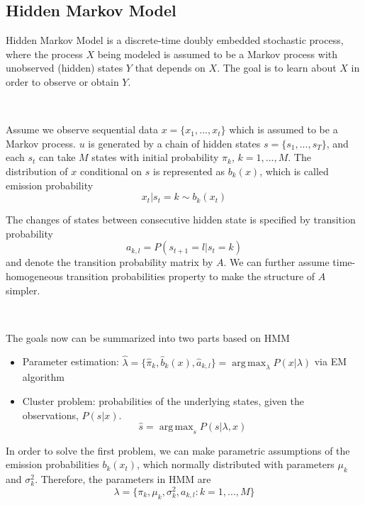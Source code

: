 \documentclass[a4paper]{article}
\DeclareMathOperator*{\argmax}{arg\,max}
\begin{document}
\subsection{Hidden Markov Model}

Hidden Markov Model is a discrete-time doubly embedded stochastic process, where the process $X$ being modeled is assumed to be a Markov process with unobserved (hidden) states $Y$ that depends on $X$.  The goal is to learn about $X$ in order to observe or obtain $Y$.

\

Assume we observe sequential data $x = \{ x_1, ..., x_t \}$ which is assumed to be a Markov process. $u$ is generated by a chain of hidden states $s = \{ s_1, ..., s_T\}$, and each $s_t$ can take $M$ states with initial probability $\pi_k$, $k=1, ..., M$. The distribution of $x$ conditional on $s$ is represented as $b_k(x)$, which is called emission probability
\begin{equation}
	x_t | s_t = k \sim b_k (x_t)
\end{equation}


The changes of states between consecutive hidden state is specified by transition probability 
\begin{equation}
	a_{k,l} = P(s_{t+1} = l | s_t = k) 
\end{equation}
and denote the transition probability matrix by $A$. We can further assume time-homogeneous transition probabilities property to make the structure of $A$ simpler.  

\

The goals now can be summarized into two parts based on HMM
\begin{itemize}
	\item Parameter estimation: $\hat{\lambda} = \{ \hat{\pi}_k, \hat{b}_k(x), \hat{a}_{k,l} \}  = \argmax_{\lambda} P(x | \lambda)$ via EM algorithm 
	\item Cluster problem: probabilities of the underlying states, given the observations, $P(s|x)$.
	\begin{equation}
		\hat{s} = \argmax_s P(s | \lambda, x)
	\end{equation}
\end{itemize}

In order to solve the first problem, we can make parametric assumptions of the emission probabilities $b_k(x_t)$, which normally distributed with parameters $\mu_k$ and $\sigma_k^2$. Therefore, the parameters in HMM are 
\begin{equation}
	\lambda = \{ \pi_k, \mu_k, \sigma_k^2, a_{k,l} : k = 1, ..., M \}
\end{equation}
\end{document}
